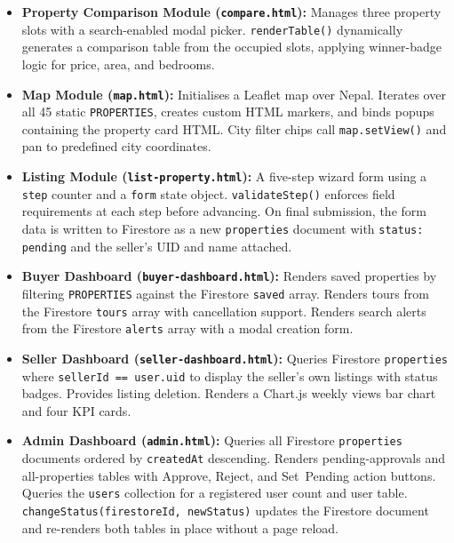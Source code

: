 \documentclass[12pt,a4paper]{report}
\begin{document}
\begin{itemize}[leftmargin=2.5em]
  \item \textbf{Property Comparison Module (\texttt{compare.html}):}
    Manages three property slots with a search-enabled modal picker.
    \texttt{renderTable()} dynamically generates a comparison table from the
    occupied slots, applying winner-badge logic for price, area, and bedrooms.

  \item \textbf{Map Module (\texttt{map.html}):}
    Initialises a Leaflet map over Nepal. Iterates over all 45 static
    \texttt{PROPERTIES}, creates custom HTML markers, and binds popups
    containing the property card HTML. City filter chips call
    \texttt{map.setView()} and pan to predefined city coordinates.

  \item \textbf{Listing Module (\texttt{list-property.html}):}
    A five-step wizard form using a \texttt{step} counter and a \texttt{form}
    state object. \texttt{validateStep()} enforces field requirements at each
    step before advancing. On final submission, the form data is written to
    Firestore as a new \texttt{properties} document with \texttt{status: pending}
    and the seller's UID and name attached.

  \item \textbf{Buyer Dashboard (\texttt{buyer-dashboard.html}):}
    Renders saved properties by filtering \texttt{PROPERTIES} against the
    Firestore \texttt{saved} array. Renders tours from the Firestore
    \texttt{tours} array with cancellation support. Renders search alerts from
    the Firestore \texttt{alerts} array with a modal creation form.

  \item \textbf{Seller Dashboard (\texttt{seller-dashboard.html}):}
    Queries Firestore \texttt{properties} where \texttt{sellerId == user.uid}
    to display the seller's own listings with status badges. Provides listing
    deletion. Renders a Chart.js weekly views bar chart and four KPI cards.

  \item \textbf{Admin Dashboard (\texttt{admin.html}):}
    Queries all Firestore \texttt{properties} documents ordered by
    \texttt{createdAt} descending. Renders pending-approvals and all-properties
    tables with Approve, Reject, and Set~Pending action buttons. Queries the
    \texttt{users} collection for a registered user count and user table.
    \texttt{changeStatus(firestoreId, newStatus)} updates the Firestore document
    and re-renders both tables in place without a page reload.
\end{itemize}
\end{document}
